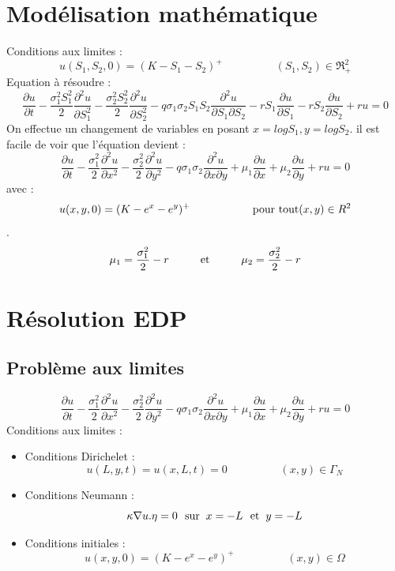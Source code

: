 \documentclass{book}
\begin{document}
\section{Modélisation mathématique}
Conditions aux limites :
 \[u(S_{1},S_{2},0)=(K-S_{1}-S_{2})^{+}  \hspace{2cm} (S_{1},S_{2})\in \Re_{+}^{2}\] 
Equation à résoudre : 
\[
\frac{\partial u}{\partial t}-\frac{\sigma_{1}^{2}S_{1}^{2}}{2}\frac{\partial^{2}u}{\partial S_{1}^{2}}-\frac{\sigma_{2}^{2}S_{2}^{2}}{2}\frac{\partial^{2}u}{\partial S_{2}^{2}}-q\sigma_{1}\sigma_{2}S_{1}S_{2}\frac{\partial^{2}u}{\partial S_{1}\partial S_{2}}-rS_{1}\frac{\partial u}{\partial S_{1}}-rS_{2}\frac{\partial u}{\partial S_{2}}+ru=0
\]
On effectue un changement de variables en posant $x=logS_{1},y=logS_{2}$. il est facile
de voir que l'équation devient :
\[
\frac{\partial u}{\partial t}-\frac{\sigma_{1}^{2}}{2}\frac{\partial^{2}u}{\partial x^{2}}-\frac{\sigma_{2}^{2}}{2}\frac{\partial^{2}u}{\partial y^{2}}-q\sigma_{1}\sigma_{2}\frac{\partial^{2}u}{\partial x\partial y}+\mu_{1}\frac{\partial u}{\partial x}+\mu_{2}\frac{\partial u}{\partial y}+ru=0\]
avec :
\[u(x,y,0)=(K-e^{x}-e^{y})^{+} \hspace{2cm} \hbox{pour tout} (x,y)\in R^{2}\].
\[\mu_{1}=\frac{\sigma_{1}^{2}}{2}-r \hspace{1cm} \hbox{et} \hspace{1cm} \mu_{2}=\frac{\sigma_{2}^{2}}{2}-r\]


\section{Résolution EDP}
\subsection*{Problème aux limites}
\begin{equation}
\label{limites}
\frac{\partial u}{\partial t}-\frac{\sigma_{1}^{2}}{2}\frac{\partial^{2}u}{\partial x^{2}}-\frac{\sigma_{2}^{2}}{2}\frac{\partial^{2}u}{\partial y^{2}}-q\sigma_{1}\sigma_{2}\frac{\partial^{2}u}{\partial x\partial y}+\mu_{1}\frac{\partial u}{\partial x}+\mu_{2}\frac{\partial u}{\partial y}+ru=0
\end{equation}
Conditions aux limites :
\begin{itemize}
 \item Conditions Dirichelet : 
	\[u(L,y,t)=u(x,L,t)=0 \hspace{2cm} (x,y)\in \Gamma_{N}\]
 \item Conditions Neumann    : 
	\[\kappa \nabla u.\eta =0 ~~\hbox{sur}\hspace{0.2cm}x=-L~~\hbox{et}\hspace{0.2cm}  y=-L \]
 \item Conditions initiales :
   	\[u(x,y,0)=(K-e^{x}-e^{y})^{+}  \hspace{2cm} (x,y)\in \Omega\] 
\end{itemize}
\end{document}
